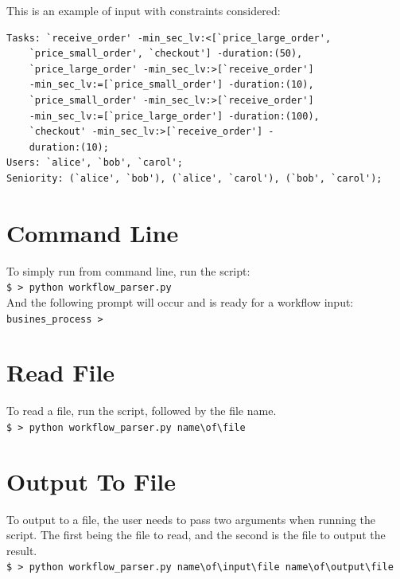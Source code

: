 \documentclass[a4paper]{report}
\begin{document}
This is an example of input with constraints considered:
\begin{lstlisting}[frame=single]
Tasks: `receive_order' -min_sec_lv:<[`price_large_order', 
	`price_small_order', `checkout'] -duration:(50), 
	`price_large_order' -min_sec_lv:>[`receive_order'] 
	-min_sec_lv:=[`price_small_order'] -duration:(10), 
	`price_small_order' -min_sec_lv:>[`receive_order'] 
	-min_sec_lv:=[`price_large_order'] -duration:(100), 
	`checkout' -min_sec_lv:>[`receive_order'] -
	duration:(10); 
Users: `alice', `bob', `carol'; 
Seniority: (`alice', `bob'), (`alice', `carol'), (`bob', `carol');
\end{lstlisting}

\section{Command Line}
To simply run from command line, run the script:\\
\texttt{\$ > python workflow\_parser.py} \\
And the following prompt will occur and is ready for a workflow input:\\
\texttt{busines\_process > }

\section{Read File}
To read a file, run the script, followed by the file name.\\
\texttt{\$ > python workflow\_parser.py name\textbackslash of\textbackslash file}

\section{Output To File}
To output to a file, the user needs to pass two arguments when running the script. The first being the file to read, and the second is the file to output the result.\\
\texttt{\$ > python workflow\_parser.py name\textbackslash of\textbackslash input\textbackslash file name\textbackslash of\textbackslash output\textbackslash file}


\end{document}
